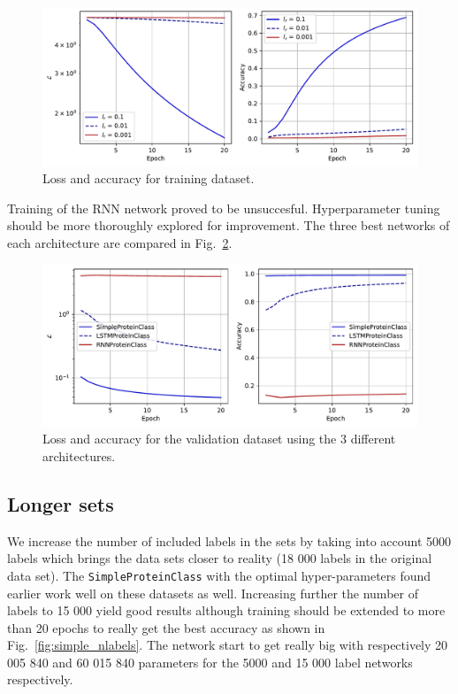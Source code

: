\documentclass[12pt]{article}
\begin{document}
\begin{figure}[htbp]
    \centering
    \includegraphics[width=\textwidth]{figures/loss_acc_lstm_train.pdf}
    \caption{Loss and accuracy for training dataset.}
    \label{fig:loss_acc_lstm200labels}
\end{figure}

Training of the RNN network proved to be unsuccesful. Hyperparameter tuning should be more thoroughly explored for improvement. The three best networks of each architecture are compared in Fig.~\ref{fig:networks_comp}.

\begin{figure}[htbp]
    \centering
    \includegraphics[width=\textwidth]{figures/networks_comp_200labels.pdf}
    \caption{Loss and accuracy for the validation dataset using the 3 different architectures.}
    \label{fig:networks_comp}
\end{figure}

\subsection{Longer sets}

We increase the number of included labels in the sets by taking into account 5000 labels which brings the data sets closer to reality (18 000 labels in the original data set). The \texttt{SimpleProteinClass} with the optimal hyper-parameters found earlier work well on these datasets as well. Increasing further the number of labels to 15 000 yield good results although training should be extended to more than 20 epochs to really get the best accuracy as shown in Fig.~\ref{fig:simple_nlabels}. The network start to get really big with respectively 20 005 840 and 60 015 840 parameters for the 5000 and 15 000 label networks respectively.
\end{document}
